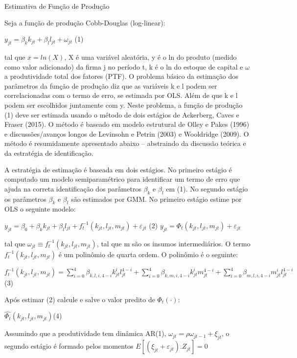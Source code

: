 Estimativa de Função de Produção

Seja a função de produção Cobb-Douglas (log-linear):

$y_{jt} = \beta_k k_{jt} + \beta_l l_{jt} + \omega_{jt}$ (1)

tal que $x = ln(X)$, X é uma variável aleatória, y é o ln do produto (medido como valor adicionado) da firma j no período t, k é o ln do estoque de capital e $\omega$ a produtividade total dos fatores (PTF).
O problema básico da estimação dos parâmetros da função de produção diz que as variáveis k e l podem ser correlacionadas com o termo de erro, se estimada por OLS. Além de que k e l podem ser escolhidos juntamente com y.
Neste problema, a função de produção (1) deve ser estimada usando o método de dois estágios de Ackerberg, Caves e Fraser (2015). O método é baseado em modelo estrutural de Olley e Pakes (1996) e discussões/avanços longos de Levinsohn e Petrin (2003) e Wooldridge (2009). O método é resumidamente apresentado abaixo – abstraindo da discussão teórica e da estratégia de identificação.

A estratégia de estimação é baseada em dois estágios. No primeiro estágio é computado um modelo semiparamétrico para identificar um termo de erro que ajuda na correta identificação dos parâmetros $\beta_k$ e $\beta_l$ em (1). No segundo estágio os parâmetros $\beta_k$ e $\beta_l$ são estimados por GMM.
No primeiro estágio estime por OLS o seguinte modelo:

$y_{jt} = \beta_0 + \beta_k k_{jt} + \beta_l l_{jt} + f^{−1}_t (k_{jt}, l_{jt},m_{jt}) + \varepsilon_{jt}$ (2)
$y_{jt} = \Phi_t(k_{jt}, l_{jt},m_{jt}) + \varepsilon_{jt}$

tal que $\omega_{jt} \equiv f^{−1}_t (k_{jt}, l_{jt},m_{jt})$, tal que m são os insumos intermediários. O termo $f^{−1}_t (k_{jt}, l_{jt},m_{jt})$ é um polinômio de quarta ordem. O polinômio é o seguinte:

$f^{−1}_t (k_{jt}, l_{jt},m_{jt}) = \sum_{i=0}^4 \beta_{k,l,i,4−i}k^i_{jt} l^{4−i}_{jt} + \sum_{i=0}^4 \beta_{k,m,i,4−i}k^i_{jt} m^{4−i}_{jt} + \sum_{i=0}^4 \beta_{m,l,i,4−i}m^i_{jt} l^{4−i}_{jt} $ (3)

Após estimar (2) calcule e salve o valor predito de $\Phi_t(·)$:

$ \hat{\Phi_t}(k_{jt}, l_{jt},m_{jt}) $(4)

Assumindo que a produtividade tem dinâmica AR(1), $\omega_{jt} = \rho \omega_{jt−1} + \xi_{jt}$, o
segundo estágio é formado pelos momentos
$E[(\xi_{jt} + \varepsilon_{jt}).Z_{jt}] = 0$

